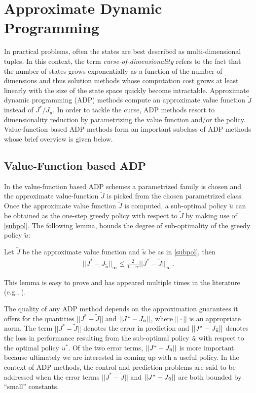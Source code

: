 \section{Approximate Dynamic Programming}
In practical problems, often the states are best described as multi-dimensional tuples.
In this context, the term \emph{curse-of-dimensionality} refers to the fact that the number of states
	grows exponentially as a function of the number of dimensions
	and thus solution methods whose computation cost grows at least linearly with the size of the state space
	quickly become intractable.
Approximate dynamic programming (ADP) \cite{lspi,lspe,ALP,wang2014approximate} methods compute an approximate value function $\tilde{J}$ instead of $J^*/J_u$. 
In order to tackle the curse, ADP methods resort to dimensionality reduction by parametrizing the value function and/or the policy. Value-function based ADP methods form an important subclass of ADP methods whose brief overview is given below.

\subsection{Value-Function based ADP}
In the value-function based ADP schemes a parametrized family is chosen and the approximate value-function $\tilde{J}$ is picked from the chosen parametrized class.
Once the approximate value function $\tilde{J}$ is computed, a sub-optimal policy $\tilde{u}$ can be obtained as the one-step greedy policy with respect to $\tilde{J}$ by making use of \eqref{subpol}.
The following lemma,
	bounds the degree of sub-optimality of the greedy policy $\tilde{u}$: 
\begin{lemma}\label{subopt}
Let $\tilde{J}$ be the approximate value function and $\tilde{u}$ be as in \eqref{subpol}, then 
\begin{align}
||J^*-J_{\tilde{u}}||_\infty \leq \frac{2}{1-\alpha}||J^*-\tilde{J}||_\infty\,.
\end{align}
\end{lemma}
This lemma is easy to prove and has appeared multiple times in the literature (e.g., \cite{SinghYee94}).
	
The quality of any ADP method depends on the approximation guarantees it offers for the quantities $||J^*-\tilde{J}||$ and $||J^*-J_{\tilde{u}}||$, where $||\cdot||$ is an appropriate norm. The term  $||J^*-\tilde{J}||$ denotes the error in prediction and $||J^*-J_{\tilde{u}}||$ denotes the loss in performance resulting from the sub-optimal policy $\tilde{u}$ with respect to the optimal policy $u^*$. Of the two error terms, $||J^*-J_{\tilde{u}}||$ is more important because ultimately we are interested in coming up with a useful policy. In the context of ADP methods, the control and prediction problems are said to be addressed when the error terms $||J^*-\tilde{J}||$ and $||J^*-J_{\tilde{u}}||$ are both bounded by ``small'' constants.

